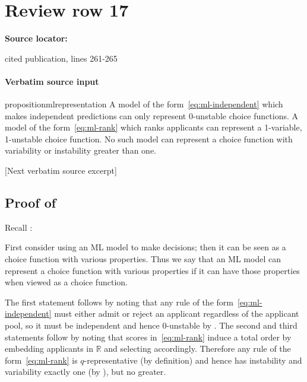 \documentclass[10pt]{article}
\begin{document}
\section*{Review row 17}
\textbf{Source locator:} {\footnotesize\raggedright cited publication, lines 261-\allowbreak{}265\par}
\paragraph{Verbatim source input}
\begin{ReviewVerbatim}
\begin{restatable}[ML Representation]{proposition}{mlrepresentation}
\label{prop:ml-representation}
A model of the form~\eqref{eq:ml-independent} which makes independent predictions can only represent 0-unstable choice functions.
A model of the form~\eqref{eq:ml-rank} which ranks applicants can represent a 1-variable, 1-unstable choice function. No such model can represent a choice function with variability or instability greater than one.
\end{restatable}

[Next verbatim source excerpt]

\subsection{Proof of } \label{sec:ml-prop-proof}

Recall :
\mlrepresentation*

First consider using an ML model to make decisions; then it can be seen as a choice function with various properties.
Thus we say that an ML model can represent a choice function with various properties if it can have those properties when viewed as a choice function. %

The first statement follows by noting that any rule of the form~\eqref{eq:ml-independent} must either admit or reject an applicant regardless of the applicant pool, so it must be independent and hence $0$-unstable by . %
The second and third statements follow by noting that scores in~\eqref{eq:ml-rank} induce a total order by embedding applicants in $\mathbb R$ and selecting accordingly. Therefore any rule of the form~\eqref{eq:ml-rank} is $q$-representative (by definition) and hence has instability and variability exactly one (by ), but no greater.
\end{ReviewVerbatim}
\end{document}
